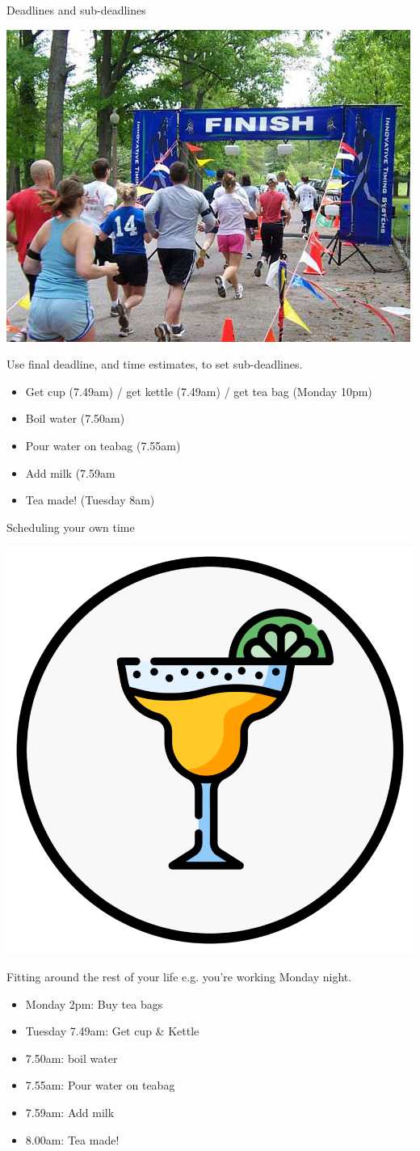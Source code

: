 \documentclass{beamer}
\begin{document}
\begin{frame}{Deadlines and sub-deadlines}
  \centerline{
  \includegraphics[width=.3\textwidth]{pics/Finish-SprintforSight-Large.jpg}
}
  
  Use final deadline, and time estimates, to set sub-deadlines.
  \begin{itemize}
    \item Get cup (7.49am) / get kettle (7.49am) / get tea bag (Monday 10pm)
    \item Boil water (7.50am)
    \item Pour water on teabag (7.55am)
    \item Add milk (7.59am 
    \item Tea made! (Tuesday 8am)
  \end{itemize}
\end{frame}

\begin{frame}{Scheduling your own time}
  \centerline{
  \includegraphics[width=.3\textwidth]{pics/Eucalyp-Deus_Cocktail.png}
}

  
  Fitting around the rest of your life e.g. you're working Monday night.
  \begin{itemize}
    \item  Monday 2pm: Buy tea bags
 \item  Tuesday 7.49am: Get cup \& Kettle
 \item  7.50am: boil water
 \item  7.55am: Pour water on teabag
 \item  7.59am: Add milk 
 \item  8.00am: Tea made!
  \end{itemize}
\end{frame}
\end{document}
